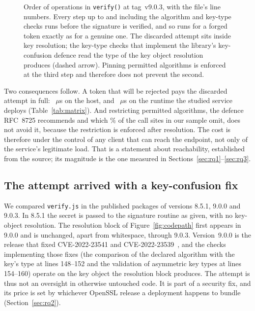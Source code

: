 \documentclass[preprint,12pt,authoryear]{elsarticle}
\newcommand{\LibraryTag}{tag~v9.0.3}
\begin{document}
\begin{figure}[!t]
\centering

\caption{Order of operations in \texttt{verify()} at \LibraryTag, with the
file's line numbers. Every step up to and including the algorithm and key-type
checks runs before the signature is verified, and so runs for a forged token
exactly as for a genuine one. The discarded attempt sits inside key
resolution; the key-type checks that implement the library's key-confusion
defence read the type of the key object resolution produces (dashed arrow).
Pinning permitted algorithms is enforced at the third step and therefore does
not prevent the second.}
\label{fig:verifyorder}
\end{figure}

Two consequences follow. A token that will be rejected pays the discarded
attempt in full: \HostProbeThrows~$\mu$s on the host, and
\NodeEighteenProbeThrows~$\mu$s on the runtime the studied service deploys
(Table~\ref{tab:matrix}). And restricting permitted algorithms, the defence
RFC~8725 recommends and which \SampleNoAlgorithmsPct\% of the call sites in our
sample omit, does not avoid it, because the restriction is enforced after
resolution. The cost is therefore under the control of any client that can
reach the endpoint, not only of the service's legitimate load. That is a
statement about reachability, established from the source; its magnitude is
the one measured in Sections~\ref{sec:rq1}--\ref{sec:rq3}.

\subsection{The attempt arrived with a key-confusion fix}\label{sec:provenance}

We compared \texttt{verify.js} in the published packages of versions 8.5.1,
9.0.0 and 9.0.3. In 8.5.1 the secret is passed to the signature routine as
given, with no key-object resolution. The resolution block of
Figure~\ref{fig:codepath} first appears in 9.0.0 and is unchanged, apart from
whitespace, through 9.0.3. Version~9.0.0 is the release that fixed
CVE-2022-23541 and CVE-2022-23539~\citep{auth0bulletin2022}, and the checks
implementing those fixes (the comparison of the declared algorithm with the
key's type at lines 148--152 and the validation of asymmetric key types at
lines 154--160) operate on the key object the resolution block produces.
The attempt is thus not an oversight in otherwise untouched code. It is part
of a security fix, and its price is set by whichever OpenSSL release a
deployment happens to bundle (Section~\ref{sec:rq2}).
\end{document}
